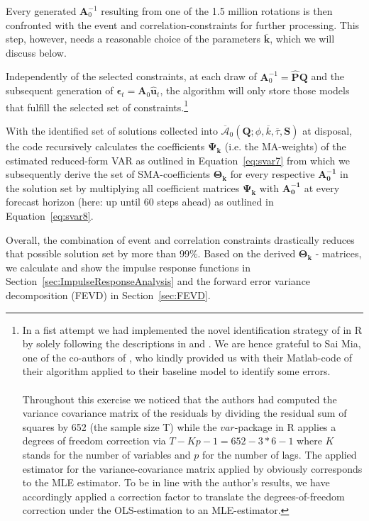 \documentclass[a4paper,11pt,listof=nochaptergap,oneside,pointednumbers,bibtotoc,bigheadings,liststotoc,hidelinks]{scrbook}
\theoremstyle{mysatz}
\theoremstyle{mydefinition}
\theoremstyle{mytheorem}
\theoremstyle{mybemerkung}
\let\oldhat\hat
\newcommand{\vect}[1]{\boldsymbol{\mathbf{#1}}}
\newcommand{\hatt}[1]{\oldhat{\boldsymbol{\mathbf{#1}}}}
\begin{document}
Every generated $\vect{A}_0^{-1}$ resulting from one of the 1.5 million rotations is then confronted with the event and correlation-constraints for further processing. This step, however, needs a reasonable choice of the parameters $\overline{\vect{k}}$, which we will discuss below.

Independently of the selected constraints, at each draw of $\vect{A}_0^{-1} = \hatt{\vect{P}}\vect{Q}$ and the subsequent generation of $\vect{\epsilon}_t = \vect{A}_0\hatt{\vect{u}}_t$, the algorithm will only store those models that fulfill the selected set of constraints.\footnote{In a fist attempt we had implemented the novel identification strategy of \citet{ludvigsonetal:18} in R by solely following the descriptions in \citet{ludvigsonetal:18} and \citet{ludvigsonetal:17}. We are hence grateful to Sai Mia, one of the co-authors of \citet{ludvigsonetal:18,ludvigsonetal:19}, who kindly provided us with their Matlab-code of their algorithm applied to their baseline model to identify some errors.\\
\\
Throughout this exercise we noticed that the authors had computed the variance covariance matrix of the residuals by dividing the residual sum of squares by 652 (the sample size T) while the $var$-package in R applies a degrees of freedom correction via $T-Kp-1 = 652 - 3*6 - 1$ where $K$ stands for the number of variables and $p$ for the number of lags. The applied estimator for the variance-covariance matrix applied by \citet{ludvigsonetal:18} obviously corresponds to the MLE estimator. To be in line with the author's results, we have accordingly applied a correction factor to translate the degrees-of-freedom correction under the OLS-estimation to an MLE-estimator.\label{ftn:MatlabCodeFootnote}}

With the identified set of solutions collected into $\overline{\vect{\mathcal{A}}}_0(\vect{Q}; \phi, \overline{k}, \overline{\tau}, \vect{S})$ at disposal, the code recursively calculates the coefficients $\vect{\Psi_k}$ (i.e. the MA-weights) of the estimated reduced-form VAR as outlined in Equation~\ref{eq:svar7} from which we subsequently derive the set of SMA-coefficients $\vect{\Theta_k}$ for every respective $\vect{A_{0}^{-1}}$ in the solution set by multiplying all coefficient matrices $\vect{\Psi_k}$ with $\vect{A_{0}^{-1}}$ at every forecast horizon (here: up until 60 steps ahead) as outlined in Equation~\ref{eq:svar8}.

Overall, the combination of event and correlation constraints drastically reduces that possible solution set by more than 99\%. Based on the derived  $\vect{\Theta_k}$ - matrices, we calculate and show the impulse response functions in Section~\ref{sec:ImpulseResponseAnalysis} and the forward error variance decomposition (FEVD) in Section~\ref{sec:FEVD}.\\
\end{document}
